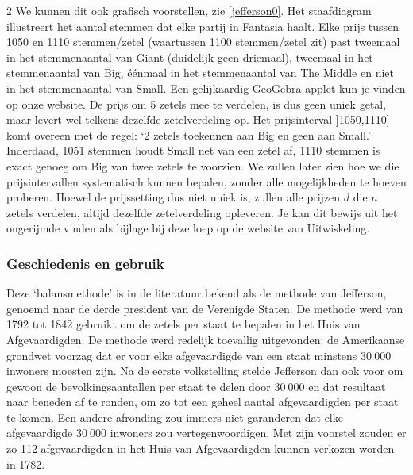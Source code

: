 \begin{multicols}{2}
We kunnen dit ook grafisch voorstellen, zie \autoref{jefferson0}. Het staafdiagram illustreert het aantal stemmen dat elke partij in Fantasia haalt. Elke prijs tussen {\color{orange}1050} en  {\color{cyan}1110} stemmen/zetel (waartussen 1100 stemmen/zetel zit) past tweemaal in het stemmenaantal van Giant (duidelijk geen driemaal), tweemaal in het stemmenaantal van Big, éénmaal in het stemmenaantal van The Middle en niet in het stemmenaantal van Small. Een gelijkaardig GeoGebra-applet kun je vinden op onze website.
\afbeelding{img/grafiek3.png}{Aantal keer dat prijzen in het interval ]{\color{orange}1050}, {\color{cyan}1110}] passen in het stemmenaantal per partij in Fantasia}{jefferson0}
De prijs om 5 zetels mee te verdelen, is dus geen uniek getal, maar levert wel telkens dezelfde zetelverdeling op. Het prijsinterval  ]{\color{orange}1050},{\color{cyan}1110}] komt overeen met de regel: `2 zetels toekennen aan Big en geen aan Small.' Inderdaad,  {\color{orange}1051} stemmen houdt Small net van een zetel af, {\color{cyan}1110}  stemmen is exact genoeg om Big van twee zetels te voorzien. We zullen later zien hoe we die prijsintervallen systematisch kunnen bepalen, zonder alle mogelijkheden te hoeven proberen. Hoewel de prijssetting dus niet uniek is, zullen alle prijzen $d$ die $n$ zetels verdelen, altijd dezelfde zetelverdeling opleveren. Je kan dit bewijs uit het ongerijmde vinden als bijlage bij deze loep op de website van Uitwiskeling.

\subsubsection{Geschiedenis en gebruik} 

Deze `balansmethode' is in de literatuur bekend als de methode van Jefferson, genoemd naar de derde president van de Verenigde Staten. De methode werd van 1792 tot 1842 gebruikt om de zetels per staat te bepalen in het Huis van Afgevaardigden. De methode werd redelijk toevallig uitgevonden: de Amerikaanse grondwet voorzag dat er voor elke afgevaardigde van een staat minstens $30~000$ inwoners moesten zijn. 
Na de eerste volkstelling stelde Jefferson dan ook voor om gewoon de bevolkingsaantallen per staat te delen door $30~000$ en dat resultaat naar beneden af te ronden, om zo tot een geheel aantal afgevaardigden per staat te komen. Een andere afronding zou immers niet garanderen dat elke afgevaardigde $30~000$ inwoners zou vertegenwoordigen. Met zijn voorstel zouden er zo 112 afgevaardigden in het Huis van Afgevaardigden kunnen verkozen worden in 1782.


\end{multicols}
